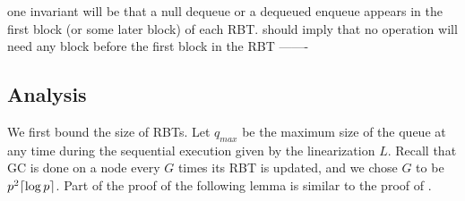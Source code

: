 one invariant will be that a null dequeue or a dequeued enqueue appears in the first block (or some later block) of each RBT.
should imply that no operation will need any block before the first block in the RBT
-------

\subsection{Analysis}
\label{sec::GCanalysis}


We first bound the size of RBTs.  Let $q_{max}$ be the maximum size of the queue at any time during the sequential execution given by the linearization $L$.
Recall that GC is done on a node every $G$ times its RBT is updated, and we chose $G$ to be $p^2\lceil \log p \rceil$.
Part of the proof of the following lemma is similar to the proof of .

